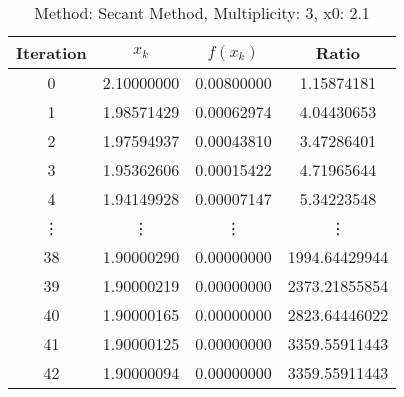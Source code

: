 \begin{table}
\centering
\caption{Method: Secant Method, Multiplicity: 3, x0: 2.1}
\label{tab:table_Secant_Method_3_2_1}
\begin{tabular}{c c c c}
\toprule
Iteration &      $x_k$ &   $f(x_k)$ &         Ratio \\
\midrule
        0 & 2.10000000 & 0.00800000 &    1.15874181 \\
        1 & 1.98571429 & 0.00062974 &    4.04430653 \\
        2 & 1.97594937 & 0.00043810 &    3.47286401 \\
        3 & 1.95362606 & 0.00015422 &    4.71965644 \\
        4 & 1.94149928 & 0.00007147 &    5.34223548 \\
   \vdots &     \vdots &     \vdots &        \vdots \\
       38 & 1.90000290 & 0.00000000 & 1994.64429944 \\
       39 & 1.90000219 & 0.00000000 & 2373.21855854 \\
       40 & 1.90000165 & 0.00000000 & 2823.64446022 \\
       41 & 1.90000125 & 0.00000000 & 3359.55911443 \\
       42 & 1.90000094 & 0.00000000 & 3359.55911443 \\
\bottomrule
\end{tabular}
\end{table}
